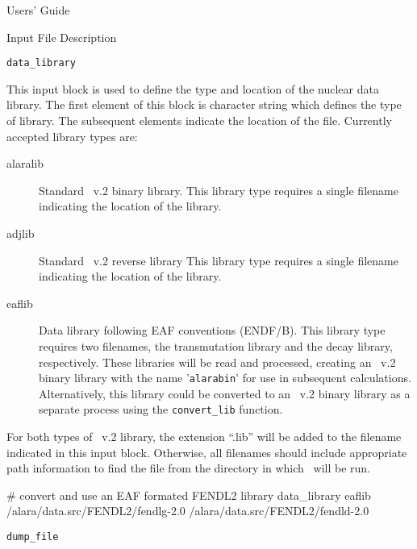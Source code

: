 \begin{chapter}{Users' Guide\label{app:user.guide}}
\begin{section}{Input File Description\label{app:user.input}}
    \begin{subsection}{\texttt{data\_library}\label{sec:user.input.datalib}}
      
      This input block is used to define the type and location of the
      nuclear data library.  The first element of this block is
      character string which defines the type of library.  The
      subsequent elements indicate the location of the file.
      Currently accepted library types are:
      \begin{description}
      \item[alaralib] Standard \ALARA\ v.2 binary library.  This
        library type requires a single filename indicating the
        location of the library.
      \item[adjlib] Standard \ALARA\ v.2 reverse library  This
        library type requires a single filename indicating the
        location of the library.
      \item[eaflib] Data library following EAF conventions (ENDF/B).
        This library type requires two filenames, the transmutation
        library and the decay library, respectively.  These libraries
        will be read and processed, creating an \ALARA\ v.2 binary
        library with the name '\texttt{alarabin}' for use in
        subsequent calculations.  Alternatively, this library could be
        converted to an \ALARA\ v.2 binary library as a separate
        process using the \texttt{convert\_lib} function.
      \end{description}

      For both types of \ALARA\ v.2 library, the extension ``.lib''
      will be added to the filename indicated in this input block.
      Otherwise, all filenames should include appropriate path
      information to find the file from the directory in which \ALARA\
      will be run.

      \begin{center}
        \renewcommand{\baselinestretch}{1}\normalsize
        \begin{boxedverbatim}
# convert and use an EAF formated FENDL2 library
data_library eaflib /alara/data.src/FENDL2/fendlg-2.0
       /alara/data.src/FENDL2/fendld-2.0          
\end{boxedverbatim}
      \end{center}

    \end{subsection}

    \begin{subsection}{\texttt{dump\_file}\label{sec:user.input.dump}}
      

\end{subsection}
\end{section}
\end{chapter}
